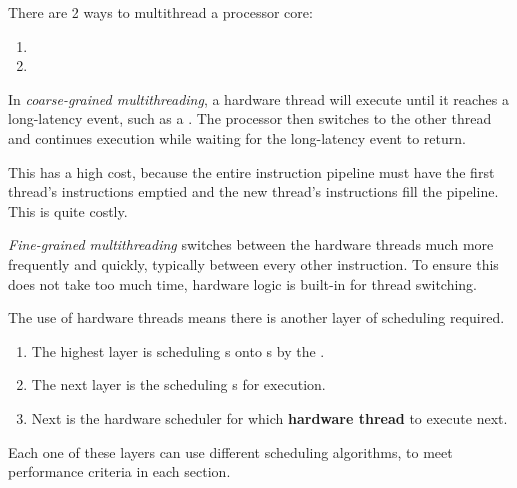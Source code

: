 There are 2 ways to multithread a processor core:
\begin{enumerate}[noitemsep]
\item {}
\item {}
\end{enumerate}

\begin{definition}\label{def:Coarse_Grained_Multithreading}
  In \emph{coarse-grained multithreading}, a hardware thread will execute until it reaches a long-latency event, such as a .
  The processor then switches to the other thread and continues execution while waiting for the long-latency event to return.

  This has a high cost, because the entire instruction pipeline must have the first thread's instructions emptied and the new thread's instructions fill the pipeline.
  This is quite costly.
\end{definition}

\begin{definition}\label{def:Fine_Grained_Multithreading}
  \emph{Fine-grained multithreading} switches between the hardware threads much more frequently and quickly, typically between every other instruction.
  To ensure this does not take too much time, hardware logic is built-in for thread switching.
\end{definition}

The use of hardware threads means there is another layer of scheduling required.
\begin{enumerate}[noitemsep]
\item The highest layer is scheduling s onto s by the .
\item The next layer is the  scheduling s for execution.
\item Next is the hardware scheduler for which \textbf{hardware thread} to execute next.
\end{enumerate}

Each one of these layers can use different scheduling algorithms, to meet performance criteria in each section.

